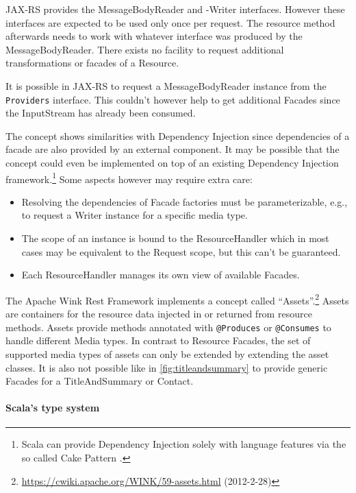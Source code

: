 \documentclass[11pt,a4paper,headsepline,twoside]{scrartcl}		%
\newcommand{\citeurl}[2]{\url{#1} (#2)}
\begin{document}
JAX-RS provides the MessageBodyReader and -Writer interfaces. However these
interfaces are expected to be used only once per request. The resource method
afterwards needs to work with whatever interface was produced by the
MessageBodyReader. There exists no facility to request additional
transformations or facades of a Resource.

It is possible in JAX-RS to request a MessageBodyReader instance from the
\lstinline:Providers: interface. This couldn't however help to get additional
Facades since the InputStream has already been consumed.

The concept shows similarities with Dependency Injection since dependencies of a
facade are also provided by an external component. It may be possible that the
concept could even be implemented on top of an existing Dependency Injection
framework.\footnote{Scala can provide Dependency Injection solely with language
  features via the so called Cake Pattern \cite{Warski2011} \cite{Odersky2005}.}
 Some aspects however may require extra care:

\begin{itemize}
\item Resolving the dependencies of Facade factories must be parameterizable,
  e.g., to request a Writer instance for a specific media type.
\item The scope of an instance is bound to the ResourceHandler which in most
  cases may be equivalent to the Request scope, but this can't be guaranteed.
\item Each ResourceHandler manages its own view of available Facades.
\end{itemize}

The Apache Wink Rest Framework implements a concept called
``Assets''.\footnote{\citeurl{https://cwiki.apache.org/WINK/59-assets.html}{2012-2-28}}
Assets are containers for the resource data injected in or returned from
resource methods. Assets provide methods annotated with \lstinline:@Produces: or
\lstinline:@Consumes: to handle different Media types. In contrast to Resource
Facades, the set of supported media types of assets can only be extended by
extending the asset classes. It is also not possible like in
\autoref{fig:titleandsummary} to provide generic Facades for a TitleAndSummary
or Contact.

\paragraph{Scala's type system}
\end{document}
